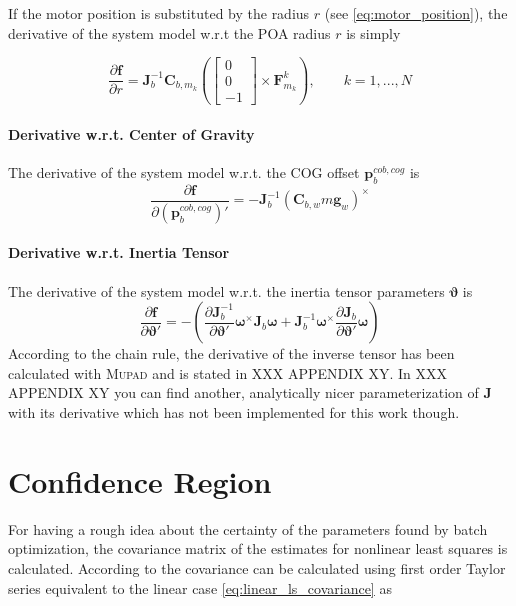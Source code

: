 If the motor position is substituted by the radius $r$ (see \eqref{eq:motor_position}), the derivative of the system model w.r.t the POA radius $r$ is simply

\begin{equation}
\frac{\partial \mathbf{f}}{\partial r} =
\mathbf{J}_b^{-1} 
\mathbf{C}_{b,m_k}
\left(
\left[ \begin{array}{c}
0 \\
0 \\
-1
\end{array} \right]
\times
\mathbf{F}^k_{m_k} \right)
, \qquad k = 1,...,N
\end{equation}

\paragraph{Derivative w.r.t. Center of Gravity\\}
The derivative of the system model w.r.t. the COG offset $\mathbf{p}^{cob,cog}_{b}$ is
\begin{equation}
\frac{\partial \mathbf{f}}{\partial (\mathbf{p}^{cob,cog}_{b})'} =
-
\mathbf{J}_b^{-1} 
\left( \mathbf{C}_{b,w} m \mathbf{g}_w \right) ^\times
\end{equation}

\paragraph{Derivative w.r.t. Inertia Tensor\\}
The derivative of the system model w.r.t. the inertia tensor parameters $\boldsymbol{\vartheta}$ is
\begin{equation}
\frac{\partial \mathbf{f}}{\partial \boldsymbol{\vartheta}'} =
-
\left(
\frac{\partial \mathbf{J}_b^{-1}}{\partial \boldsymbol{\vartheta}'}
\boldsymbol{\omega} ^\times \mathbf{J}_b \boldsymbol{\omega}
+
\mathbf{J}_b^{-1}
\boldsymbol{\omega} ^\times \frac{\partial \mathbf{J}_b}{\partial \boldsymbol{\vartheta}'} \boldsymbol{\omega}
\right)
\end{equation}
According to the chain rule, the derivative of the inverse tensor has been calculated with \textsc{Mupad} and is stated in XXX APPENDIX XY. In XXX APPENDIX XY you can find another, analytically nicer parameterization of $\mathbf{J}$ with its derivative which has not been implemented for this work though.


\section{Confidence Region}
For having a rough idea about the certainty of the parameters found by batch optimization, the covariance matrix of the estimates for nonlinear least squares is calculated.
According to \citet[chap. 2]{Seber} the covariance can be calculated using first order Taylor series equivalent to the linear case \eqref{eq:linear_ls_covariance} as

